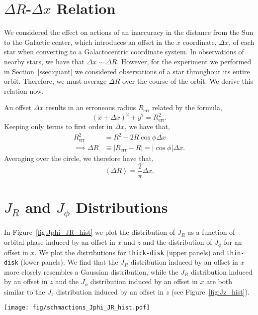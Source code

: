 \documentclass[twocolumn]{aastex62}
\newcommand{\pc}{\text{pc}}
\newcommand{\abs}[1]{\left| #1 \right|}
\newcommand{\avg}[1]{\left< #1 \right>}
\newcommand{\beq}{\begin{equation}}
\newcommand{\eeq}{\end{equation}}
\newcommand{\thin}{\texttt{thin-disk}}
\newcommand{\thick}{\texttt{thick-disk}}
\begin{document}
\section{$\Delta R$-$\Delta x$ Relation} \label{app:deltax}
We considered the effect on actions of an inaccuracy in the distance from the
Sun to the Galactic center, which introduces an offset in the $x$ coordinate,
$\Delta x$, of each star when converting to a Galactocentric coordinate
system. In observations of nearby stars, we have that $\Delta x \sim \Delta
R$. However, for the experiment we performed in Section~\ref{ssec:quant} we
considered observations of a star throughout its entire orbit. Therefore, we
must average $\Delta R$ over the course of the orbit. We derive this relation
now.

An offset $\Delta x$ results in an erroneous radius $R_{\text{err}}$ related by
the formula,
\beq
(x+\Delta x)^2 + y^2 = R_{\text{err}}^2\text{.}
\eeq
Keeping only terms to first order in $\Delta x$, we have that,
\beq
\begin{split}
R_{\text{err}}^2 &= R^2 - 2 R \cos{\phi} \Delta x \\
\implies \Delta R &\equiv \abs{R_{\text{err}} - R}
        = \abs{\cos{\phi}} \Delta x\text{.}
\end{split}
\eeq
Averaging over the circle, we therefore have that,
\beq
\avg{\Delta R} = \frac{2}{\pi} \Delta x\text{.}
\eeq

\section{$J_R$ and $J_{\phi}$ Distributions} \label{app:hist}

In Figure~\ref{fig:Jphi_JR_hist} we plot the distribution of $J_R$ as a
function of orbital phase induced by an offset in $x$ and $z$ and the
distribution of $J_{\phi}$ for an offset in $x$. We plot the distributions for
\thick{} (upper panels) and \thin{} (lower panels). We find that the $J_R$
distribution induced by an offset in $x$ more closely resembles a Gaussian
distribution, while the $J_R$ distribution induced by an offset in $z$ and the
$J_{\phi}$ distribution induced by an offset in $x$ are both similar to the
$J_z$ distribution induced by an offset in $z$ (see Figure~\ref{fig:Jz_hist}).

\begin{figure*}
\begin{center}
\texttt{[image: fig/schmactions\_Jphi\_JR\_hist.pdf]}
\end{center}
\caption{A histogram of the values computed for $J_R$ and $J_{\phi}$ for
\thick{} (upper panels) and \thin{} (lower panels). For $J_R$ we assume an
$x$ offset (left) and $z$ offset (center) of $100\,\pc$, while for $J_{\phi}$
we consider only an $x$ offset (right). In each panel the true value is given
by a vertical dashed line. The induced error distribution in $J_R$ for an $x$
offset more closely resembles a Gaussian centered on the null value, but not
for the other two offsets considered.}
\label{fig:Jphi_JR_hist}
\end{figure*}
\end{document}
